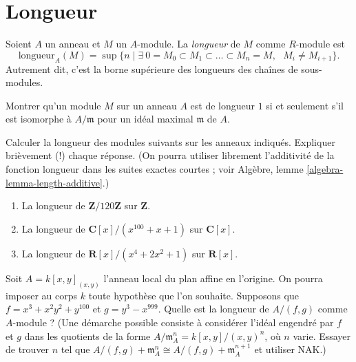 \section{Longueur}
\label{section-length}

\begin{definition}
\label{definition-length}
Soient $A$ un anneau et $M$ un $A$-module. La
{\it longueur} de $M$ comme $R$-module est
$$
\text{longueur}_A(M)
=
\sup
\{
n
\mid
\exists\ 0 = M_0 \subset M_1 \subset \ldots \subset M_n = M,
\text{ }M_i \not = M_{i + 1}
\}.
$$
Autrement dit, c'est la borne supérieure des longueurs des chaînes de sous-modules.
\end{definition}

\begin{exercise}
\label{exercise-length-is-one}
Montrer qu'un module $M$ sur un anneau $A$ est de longueur $1$ si et seulement s'il
est isomorphe à $A/\mathfrak m$ pour un idéal maximal $\mathfrak m$
de $A$.
\end{exercise}

\begin{exercise}
\label{exercise-length-easy}
Calculer la longueur des modules suivants sur les anneaux indiqués.
Expliquer brièvement (!) chaque réponse. (On pourra utiliser librement l'additivité de
la fonction longueur dans les suites exactes courtes ; voir
Algèbre, lemme \ref{algebra-lemma-length-additive}.)
\begin{enumerate}
\item La longueur de $\mathbf{Z}/120\mathbf{Z}$ sur $\mathbf{Z}$.
\item La longueur de $\mathbf{C}[x]/(x^{100} + x + 1)$ sur $\mathbf{C}[x]$.
\item La longueur de $\mathbf{R}[x]/(x^4 + 2x^2 + 1)$ sur $\mathbf{R}[x]$.
\end{enumerate}
\end{exercise}

\begin{exercise}
\label{exercise-compute-length}
Soit $A = k[x, y]_{(x, y)}$ l'anneau local du plan affine en
l'origine. On pourra imposer au corps $k$ toute hypothèse que l'on souhaite. Supposons
que $f = x^3 + x^2y^2 + y^{100}$ et $g = y^3 - x^{999}$. Quelle est la longueur
de $A/(f, g)$ comme $A$-module ? (Une démarche possible consiste à considérer
l'idéal engendré par $f$ et $g$ dans les quotients de la forme $A/{\mathfrak m}_A^n=
k[x, y]/(x, y)^n$, où $n$ varie. Essayer de trouver $n$ tel que
$A/(f, g)+{\mathfrak m}_A^n \cong A/(f, g)+{\mathfrak m}_A^{n + 1}$
et utiliser NAK.)
\end{exercise}






